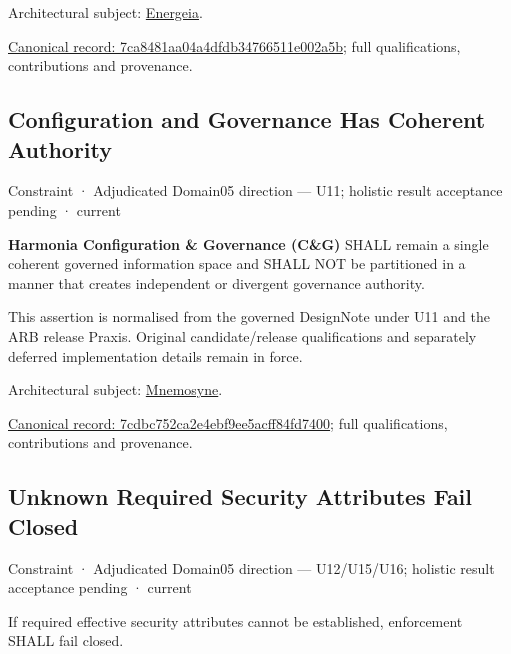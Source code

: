 Architectural subject: \hyperref[element:fb3f37a6ac614415ac486a6de9d35994]{Energeia}.


{\footnotesize \href{../../../../continuum/motivation/constraint/7ca8481aa04a4dfdb34766511e002a5b.md}{Canonical record: 7ca8481aa04a4dfdb34766511e002a5b}; full qualifications, contributions and provenance.}\par
\subsection{Configuration and Governance Has Coherent Authority}

\label{element:7cdbc752ca2e4ebf9ee5acff84fd7400}
{\small Constraint · Adjudicated Domain05 direction — U11; holistic result acceptance pending · current}\par

\textbf{Harmonia Configuration \& Governance (C\&G)} SHALL remain a single coherent governed information space and SHALL NOT be partitioned in a manner that creates independent or divergent governance authority.



This assertion is normalised from the governed DesignNote under U11 and the ARB release Praxis. Original candidate/release qualifications and separately deferred implementation details remain in force.



Architectural subject: \hyperref[element:7985e647bf9e4ca3ba70faf9e3e4ae02]{Mnemosyne}.


{\footnotesize \href{../../../../continuum/motivation/constraint/7cdbc752ca2e4ebf9ee5acff84fd7400.md}{Canonical record: 7cdbc752ca2e4ebf9ee5acff84fd7400}; full qualifications, contributions and provenance.}\par
\subsection{Unknown Required Security Attributes Fail Closed}

\label{element:7ea0d91ed25848f4add672ddf08f42a2}
{\small Constraint · Adjudicated Domain05 direction — U12/U15/U16; holistic result acceptance pending · current}\par

If required effective security attributes cannot be established, enforcement SHALL fail closed.



